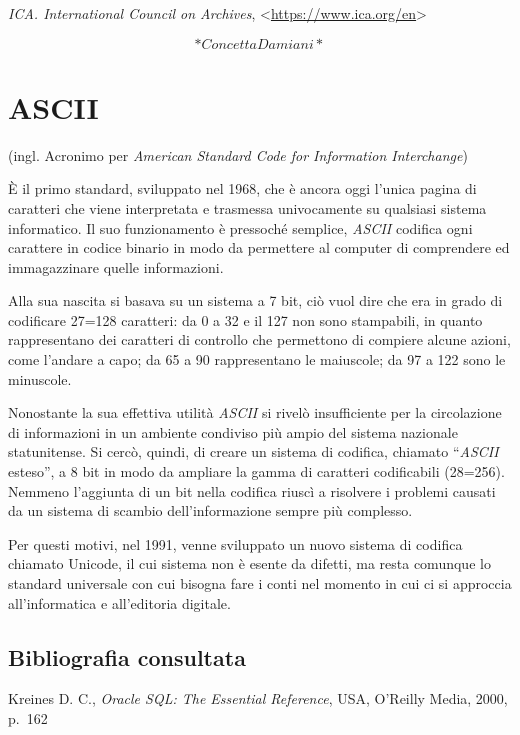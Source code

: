 \documentclass[
  b5paper,
  twoside,
  11pt,
  chapterprefix=false,
  bibliography=totocnumbered,
  listof=flat]{scrbook}
\begin{document}
\emph{ICA. International Council on Archives},
\textless{}{\url{https://www.ica.org/en}\textgreater{}}

\[*Concetta Damiani*\]

\hypertarget{ascii}{%
\chapter{ASCII}\label{ascii}}

(ingl. Acronimo per \emph{American Standard Code for Information
Interchange})

È il primo standard, sviluppato nel 1968, che è ancora oggi l'unica
pagina di caratteri che viene interpretata e trasmessa univocamente su
qualsiasi sistema informatico. Il suo funzionamento è pressoché
semplice, \emph{ASCII} codifica ogni carattere in codice binario in modo da
permettere al computer di comprendere ed immagazzinare quelle
informazioni.

Alla sua nascita si basava su un sistema a 7 bit, ciò vuol dire che era
in grado di codificare 27=128 caratteri: da 0 a 32 e il 127 non sono
stampabili, in quanto rappresentano dei caratteri di controllo che
permettono di compiere alcune azioni, come l'andare a capo; da 65 a 90
rappresentano le maiuscole; da 97 a 122 sono le minuscole.~

Nonostante la sua effettiva utilità \emph{ASCII} si rivelò insufficiente per
la circolazione di informazioni in un ambiente condiviso più ampio del
sistema nazionale statunitense. Si cercò, quindi, di creare un sistema
di codifica, chiamato \enquote{\emph{ASCII} esteso}, a 8 bit in modo da ampliare la
gamma di caratteri codificabili (28=256). Nemmeno l'aggiunta di un bit
nella codifica riuscì a risolvere i problemi causati da un sistema di
scambio dell'informazione sempre più complesso.

Per questi motivi, nel 1991, venne sviluppato un nuovo sistema di
codifica chiamato Unicode, il cui sistema non è esente da difetti, ma
resta comunque lo standard universale con cui bisogna fare i conti nel
momento in cui ci si approccia all'informatica e all'editoria digitale.

\hypertarget{bibliografia-consultata-1}{%
\section*{Bibliografia consultata}\label{bibliografia-consultata-1}}

Kreines D. C., \emph{Oracle SQL: The Essential Reference}, USA, O'Reilly
Media, 2000, p.~162
\end{document}
